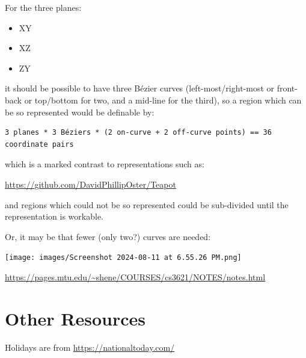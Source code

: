 \documentclass{ltxdoc}
\begin{document}
\begin{samepage}
For the three planes:

\begin{itemize}
 \item XY
 \item XZ
 \item ZY
\end{itemize}
 
\noindent it should be possible to have three Bézier curves (left-most/right-most or front-back or 
top/bottom for two, and a mid-line for the third), so a region which can be so represented would 
be definable by:
 
\begin{verbatim}
3 planes * 3 Béziers * (2 on-curve + 2 off-curve points) == 36 coordinate pairs
\end{verbatim}
\end{samepage}
 
\noindent which is a marked contrast to representations such as:
 
\url{https://github.com/DavidPhillipOster/Teapot}

\noindent and regions which could not be so represented could be sub-divided until the 
representation is workable.

Or, it may be that fewer (only two?) curves are needed:

\noindent\texttt{[image: images/Screenshot 2024-08-11 at 6.55.26 PM.png]}

\url{https://pages.mtu.edu/~shene/COURSES/cs3621/NOTES/notes.html}

\section{Other Resources}
 
Holidays are from \url{https://nationaltoday.com/}

 

\end{document}
